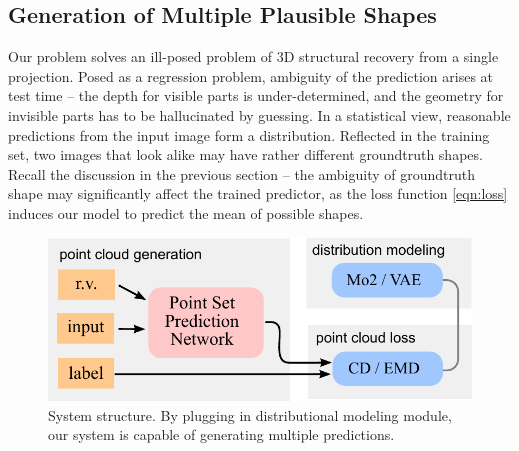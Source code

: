 \subsection{Generation of Multiple Plausible Shapes}
\label{sec:method:gan}
% 
% 

Our problem solves an ill-posed problem of 3D structural recovery from a single projection. Posed as a regression problem, ambiguity of the prediction arises at test time -- the depth for visible parts is under-determined, and the geometry for invisible parts has to be hallucinated by guessing. In a statistical view, reasonable predictions from the input image form a distribution.  Reflected in the training set, two images that look alike may have rather different groundtruth shapes. Recall the discussion in the previous section -- the ambiguity of groundtruth shape may significantly affect the trained predictor, as the loss function \eqref{eqn:loss} induces our model to predict the mean of possible shapes.  

\begin{figure}[t!]
  \centering
  \includegraphics[width=0.8\linewidth]{./fig/system.pdf}
  \caption{System structure. By plugging in distributional modeling module, our system is capable of generating multiple predictions. }
  \label{fig:network}%
\end{figure}

